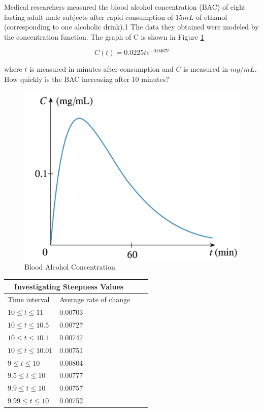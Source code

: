 Medical researchers measured the blood alcohol concentration (BAC) of eight fasting adult male subjects after rapid consumption of $15 mL$ of ethanol (corresponding to one alcoholic drink).1 The data they obtained were modeled by the concentration function. The graph of C is shown in Figure \ref{fig:Fig5}

\begin{equation}
\label{eq:4}
C(t) = 0.0225te^{-0.0467t}
\end{equation}

where $t$ is measured in minutes after consumption and $C$ is measured in $mg/mL$. How quickly is the BAC increasing after 10 minutes?

\begin{figure}[h]
    \centering
    \includegraphics[scale=0.3]{chapter001/figures/fig005}
    \caption{Blood Alcohol Concentration}
    \label{fig:Fig5}
\end{figure}

\begin{tabular}{ |p{3cm}||p{3cm}|p{3cm}|p{3cm}|}
 \hline
 \multicolumn{2}{|c|}{Investigating Steepness Values} \\
 \hline
 Time interval & Average rate of change\\
 \hline
 $10 \leq t \leq 11$    & 0.00703\\
 $10 \leq t \leq 10.5$  & 0.00727\\
 $10 \leq t \leq 10.1$  & 0.00747\\
 $10 \leq t \leq 10.01$ & 0.00751 \\
 $9 \leq t \leq 10$     & 0.00804\\
 $9.5 \leq t \leq 10$   & 0.00777\\
 $9.9 \leq t \leq 10$   & 0.00757\\
 $9.99 \leq t \leq 10$  & 0.00752\\
 \hline
\end{tabular}

